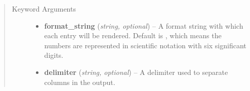 \documentclass[a4paper,10pt,english]{sphinxmanual}
\begin{document}
\begin{fulllineitems}
\begin{fulllineitems}
\begin{quote}
\begin{description}
\item[{Keyword Arguments}] \leavevmode\begin{itemize}
\item {} 
\textbf{format\_string} (\emph{string, optional}) --
A format string with which each entry will be rendered. Default is
, which means the numbers are represented in scientific
notation with six significant digits.

\item {} 
\textbf{delimiter} (\emph{string, optional}) --
A delimiter used to separate columns in the output.

\end{itemize}

\end{description}\end{quote}

\end{fulllineitems}


\end{fulllineitems}

\end{document}
